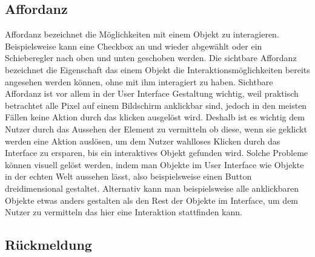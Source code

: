 \subsection*{Affordanz}

Affordanz bezeichnet die Möglichkeiten mit einem Objekt zu interagieren. Beispielsweise kann eine Checkbox an und wieder abgewählt oder ein Schieberegler nach oben und unten geschoben werden.
Die sichtbare Affordanz bezeichnet die Eigenschaft das einem Objekt die Interaktionsmöglichkeiten bereits angesehen werden können, ohne mit ihm interagiert zu haben.
Sichtbare Affordanz ist vor allem in der User Interface Gestaltung wichtig, weil praktisch betrachtet alle Pixel auf einem Bildschirm anklickbar sind, jedoch in den meisten Fällen keine Aktion durch das klicken ausgelöst wird.
Deshalb ist es wichtig dem Nutzer durch das Aussehen der Element zu vermitteln ob diese, wenn sie geklickt werden eine Aktion auslösen, um dem Nutzer wahlloses Klicken durch das Interface zu ersparen, bis ein interaktives Objekt gefunden wird.
Solche Probleme können visuell gelöst werden, indem man Objekte im User Interface wie Objekte in der echten Welt aussehen lässt, also beispielsweise einen Button dreidimensional gestaltet.
Alternativ kann man beispielsweise alle anklickbaren Objekte etwas anders gestalten als den Rest der Objekte im Interface, um dem Nutzer zu vermitteln das hier eine Interaktion stattfinden kann\cite{Knight.2019c}.

\subsection*{Rückmeldung}

